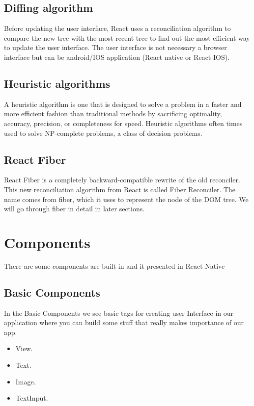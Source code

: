 \documentclass[12pt,a4paper]{report}
\begin{document}
\subsection{Diffing algorithm}

Before updating the user interface, React uses a reconciliation algorithm to compare the new tree with the most recent tree to find out the most efficient way to update the user interface. The user interface is not necessary a browser interface but can be android/IOS application (React native or React IOS).

\subsection{Heuristic algorithms}
A heuristic algorithm is one that is designed to solve a problem in a faster and more efficient fashion than traditional methods by sacrificing optimality, accuracy, precision, or completeness for speed. Heuristic algorithms often times used to solve NP-complete problems, a class of decision problems.

\subsection{React Fiber}
React Fiber is a completely backward-compatible rewrite of the old reconciler. This new reconciliation algorithm from React is called Fiber Reconciler. The name comes from fiber, which it uses to represent the node of the DOM tree. We will go through fiber in detail in later sections.

\newpage

\section{Components}
There are some components are built in and it presented in React Native -
\subsection{Basic Components}
In the Basic Components we see basic tags for creating user Interface in our application where you can build some stuff that really makes importance of our app.
\begin{itemize}
  \item View.
  \item Text.
  \item Image.
  \item TextInput.
\end{itemize}
\end{document}
